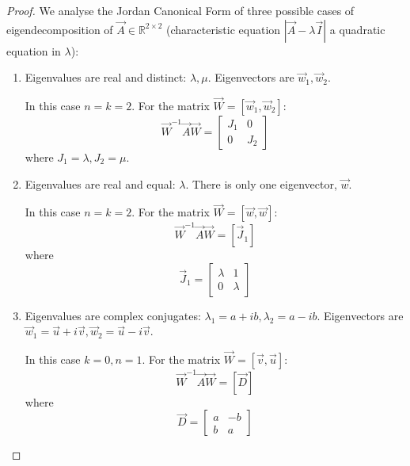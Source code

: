 \begin{proof}
	We analyse the Jordan Canonical Form of three possible cases of eigendecomposition of $\vec A \in \mathbb R^{2 \times 2}$ (characteristic equation $|\vec A - \lambda \vec I|$ a quadratic equation in $\lambda$):
	\begin{enumerate}
		\item Eigenvalues are real and distinct: $\lambda, \mu$. Eigenvectors are $\vec w_1, \vec w_2$.
		
		In this case $n = k = 2$. For the matrix $\vec W = [\vec w_1, \vec w_2]$:
		\begin{equation*}
			\vec W^{-1} \vec A \vec W =
			\begin{bmatrix}
				J_1 & 0 \\
				0 & J_2
			\end{bmatrix}
		\end{equation*}
		where $J_1 = \lambda, J_2 = \mu$.
		\item Eigenvalues are real and equal: $\lambda$. There is only one eigenvector, $\vec w$.
		
		In this case $n = k = 2$. For the matrix $\vec W = [\vec w, \vec w]$:
		\begin{equation*}
			\vec W^{-1} \vec A \vec W = [\vec J_1]
		\end{equation*}
		where
		\begin{equation*}
			\vec J_1 = 
			\begin{bmatrix}
				\lambda & 1 \\
				0 & \lambda
			\end{bmatrix}
		\end{equation*}
		\item Eigenvalues are complex conjugates: $\lambda_1 = a + ib, \lambda_2 = a - ib$. Eigenvectors are $\vec w_1 = \vec u + i \vec v, \vec w_2 = \vec u - i \vec v$.

		In this case $k = 0, n = 1$. For the matrix $\vec W = [\vec v, \vec u]$:
		\begin{equation*}
			\vec W^{-1} \vec A \vec W = [\vec D]
		\end{equation*}
		where
		\begin{equation*}
			\vec D =
			\begin{bmatrix}
				a & -b \\
				b & a
			\end{bmatrix}
		\end{equation*}
	\end{enumerate}
\end{proof}